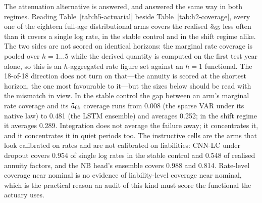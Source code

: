 The attenuation alternative is answered, and answered the same way in both
regimes. Reading Table~\ref{tab:h5-actuarial} beside
Table~\ref{tab:h2-coverage}, every one of the eighteen full-age
distributional arms covers the realised $\ddot{a}_{65}$ less often than it
covers a single log rate, in the stable control and in the shift regime
alike. The two sides are not scored on identical horizons: the marginal
rate coverage is pooled over $h=1\ldots5$ while the derived quantity is
computed on the first test year alone, so this is an $h$-aggregated rate
figure set against an $h=1$ functional. The 18-of-18 direction does not
turn on that---the annuity is scored at the shortest horizon, the one most
favourable to it---but the sizes below should be read with the mismatch in
view. In the stable control the gap between an arm's marginal rate
coverage and its $\ddot{a}_{65}$ coverage runs from 0.008 (the sparse VAR under
its native law) to 0.481 (the LSTM ensemble) and averages 0.252; in the
shift regime it averages 0.289. Integration does not average the failure
away; it concentrates it, and it concentrates it in quiet periods too. The
instructive cells are the arms that look calibrated on rates and are not
calibrated on liabilities: CNN-LC under dropout covers 0.954 of single log
rates in the stable control and 0.548 of realised annuity factors, and the
NB head's ensemble covers 0.988 and 0.814. Rate-level coverage near nominal
is no evidence of liability-level coverage near nominal, which is the
practical reason an audit of this kind must score the functional the
actuary uses.

